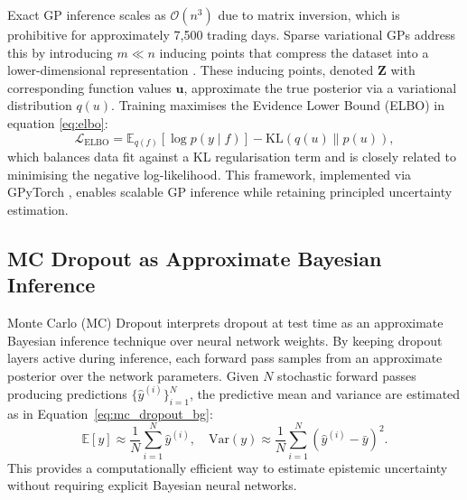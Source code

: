 Exact GP inference scales as $\mathcal{O}(n^3)$ due to matrix inversion, which is prohibitive for approximately 7,500 trading days. Sparse variational GPs address this by introducing $m \ll n$ inducing points that compress the dataset into a lower-dimensional representation \parencite{titsias2009variational}. These inducing points, denoted $\mathbf{Z}$ with corresponding function values $\mathbf{u}$, approximate the true posterior via a variational distribution $q(u)$. Training maximises the Evidence Lower Bound (ELBO) in equation \ref{eq:elbo}:
\begin{equation}
\mathcal{L}_{\mathrm{ELBO}} = \mathbb{E}_{q(f)}[\log p(y \mid f)] - \mathrm{KL}(q(u) \| p(u)),
\label{eq:elbo}
\end{equation}
which balances data fit against a KL regularisation term and is closely related to minimising the negative log-likelihood. This framework, implemented via GPyTorch \parencite{gardner2021gpytorchblackboxmatrixmatrixgaussian}, enables scalable GP inference while retaining principled uncertainty estimation.

\subsection{MC Dropout as Approximate Bayesian Inference}

Monte Carlo (MC) Dropout \parencite{gal2016dropout} interprets dropout at test time as an approximate Bayesian inference technique over neural network weights. By keeping dropout layers active during inference, each forward pass samples from an approximate posterior over the network parameters. Given $N$ stochastic forward passes producing predictions $\{\hat{y}^{(i)}\}_{i=1}^N$, the predictive mean and variance are estimated as in Equation~\ref{eq:mc_dropout_bg}:
\begin{equation}
\mathbb{E}[y] \approx \frac{1}{N} \sum_{i=1}^{N} \hat{y}^{(i)}, \quad
\mathrm{Var}(y) \approx \frac{1}{N} \sum_{i=1}^{N} \left(\hat{y}^{(i)} - \bar{y}\right)^2.
\label{eq:mc_dropout_bg}
\end{equation}
This provides a computationally efficient way to estimate epistemic uncertainty without requiring explicit Bayesian neural networks.
